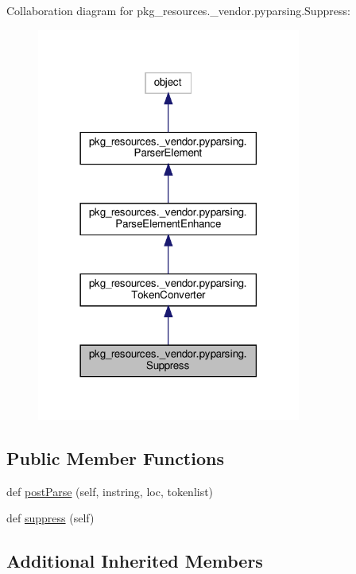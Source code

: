 Collaboration diagram for pkg\+\_\+resources.\+\_\+vendor.\+pyparsing.\+Suppress\+:
\nopagebreak
\begin{figure}[H]
\begin{center}
\leavevmode
\includegraphics[width=246pt]{classpkg__resources_1_1__vendor_1_1pyparsing_1_1Suppress__coll__graph}
\end{center}
\end{figure}
\subsection*{Public Member Functions}
\begin{DoxyCompactItemize}
\item 
def \hyperlink{classpkg__resources_1_1__vendor_1_1pyparsing_1_1Suppress_a65fa22954f7a5a732fcd5632839a8936}{post\+Parse} (self, instring, loc, tokenlist)
\item 
def \hyperlink{classpkg__resources_1_1__vendor_1_1pyparsing_1_1Suppress_a66979fab93dbde807d28890e54de5fcc}{suppress} (self)
\end{DoxyCompactItemize}
\subsection*{Additional Inherited Members}


